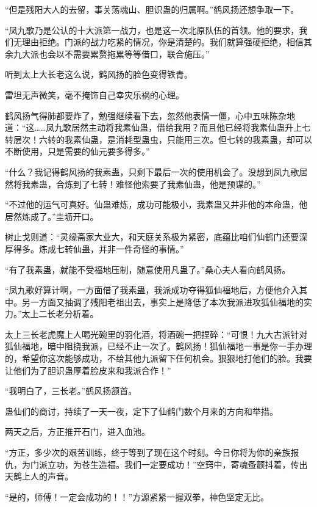 
\begin{this_body}

“但是残阳大人的去留，事关荡魂山、胆识蛊的归属啊。”鹤风扬还想争取一下。

“凤九歌乃是公认的十大派第一战力，也是这一次北原队伍的首领。他的要求，我们无理由拒绝。门派的战力吃紧的情况，你是清楚的。我们就算强硬拒绝，相信其余九大派也会以不需要累赘拖累等等借口，联合施压。”

听到太上大长老这么说，鹤风扬的脸色变得铁青。

雷坦无声微笑，毫不掩饰自己幸灾乐祸的心理。

鹤风扬气得肺都要炸了，勉强继续看下去，忽然他表情一僵，心中五味陈杂地道：“这……凤九歌居然主动将我素仙蛊，借给我用？而且他已经将我素仙蛊升上七转层次！六转的我素仙蛊，是消耗型蛊虫，只能用三次。但七转的我素蛊，却可以不断使用，只是需要的仙元要多得多。”

“什么？我记得鹤风扬的我素蛊，只剩下最后一次的使用机会了。没想到凤九歌居然将我素蛊，合炼到了七转！难怪他索要了我素仙蛊，他是预谋的。”

“不过他的运气可真好。仙蛊难炼，成功可能极小，我素蛊又并非他的本命蛊，他居然炼成了。”圭坜开口。

树止戈则道：“灵缘斋家大业大，和天庭关系极为紧密，底蕴比咱们仙鹤门还要深厚得多。炼成七转仙蛊，并非一件奇怪的事情。”

“有了我素蛊，就能不受福地压制，随意使用凡蛊了。”桑心夫人看向鹤风扬。

“凤九歌好算计啊，一方面借了我素蛊，我派成功夺得狐仙福地后，方便他介入其中。另一方面又抽调了残阳老祖出去，事实上是降低了本次我派进攻狐仙福地的实力。”太上二长老分析着。

太上三长老虎魔上人喝光碗里的羽化酒，将酒碗一把捏碎：“可恨！九大古派针对狐仙福地，暗中阻挠我派，已经不止一次了。鹤风扬！狐仙福地一事是你一手办理的，希望你这次能够成功，不给其他九派留下任何机会。狠狠地打他们的脸。我要让他们为了胆识蛊厚着脸皮来和我派合作！”

“我明白了，三长老。”鹤风扬颔首。

蛊仙们的商讨，持续了一天一夜，定下了仙鹤门数个月来的方向和举措。

两天之后，方正推开石门，进入血池。

“方正，多少次的艰苦训练，终于等到了现在这个时刻。今日你将为你的亲族报仇，为门派立功，为苍生造福。我们一定要成功！”空窍中，寄魂蚤颤抖着，传出天鹤上人的声音。

“是的，师傅！一定会成功的！！”方源紧紧一握双拳，神色坚定无比。


\end{this_body}
